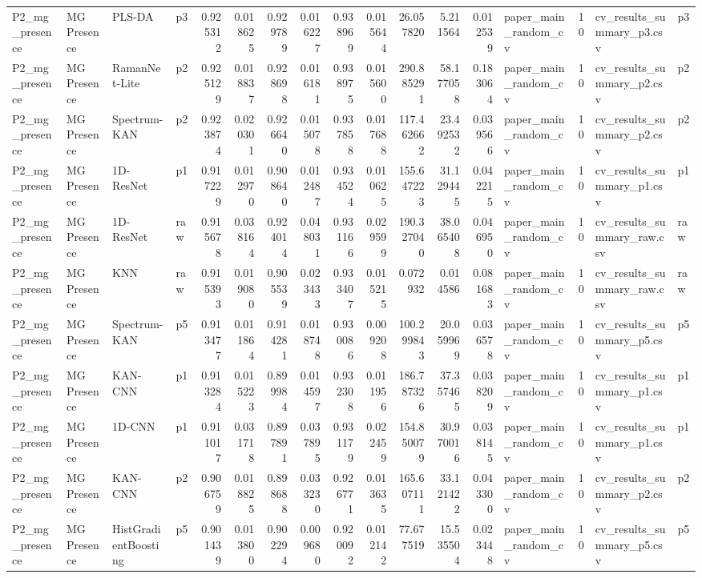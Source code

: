 \begin{tabular}{llllrrrrrrrrrlrll}
P2_mg_presence & MG Presence & PLS-DA & p3 & 0.925312 & 0.018625 & 0.929789 & 0.016227 & 0.938969 & 0.015644 & 26.057820 & 5.211564 & 0.012539 & paper_main_random_cv & 10 & cv_results_summary_p3.csv & p3 \\
P2_mg_presence & MG Presence & RamanNet-Lite & p2 & 0.925129 & 0.018837 & 0.928698 & 0.016181 & 0.938975 & 0.015600 & 290.885291 & 58.177058 & 0.183064 & paper_main_random_cv & 10 & cv_results_summary_p2.csv & p2 \\
P2_mg_presence & MG Presence & Spectrum-KAN & p2 & 0.923874 & 0.020301 & 0.926640 & 0.015078 & 0.937858 & 0.017688 & 117.462662 & 23.492532 & 0.039566 & paper_main_random_cv & 10 & cv_results_summary_p2.csv & p2 \\
P2_mg_presence & MG Presence & 1D-ResNet & p1 & 0.917229 & 0.012970 & 0.908640 & 0.012487 & 0.934524 & 0.010625 & 155.647223 & 31.129445 & 0.042215 & paper_main_random_cv & 10 & cv_results_summary_p1.csv & p1 \\
P2_mg_presence & MG Presence & 1D-ResNet & raw & 0.915678 & 0.038164 & 0.924014 & 0.048031 & 0.931166 & 0.029599 & 190.327040 & 38.065408 & 0.046950 & paper_main_random_cv & 10 & cv_results_summary_raw.csv & raw \\
P2_mg_presence & MG Presence & KNN & raw & 0.915393 & 0.019080 & 0.905539 & 0.023433 & 0.933407 & 0.015215 & 0.072932 & 0.014586 & 0.081683 & paper_main_random_cv & 10 & cv_results_summary_raw.csv & raw \\
P2_mg_presence & MG Presence & Spectrum-KAN & p5 & 0.913477 & 0.011864 & 0.914281 & 0.018748 & 0.930086 & 0.009208 & 100.299843 & 20.059969 & 0.036578 & paper_main_random_cv & 10 & cv_results_summary_p5.csv & p5 \\
P2_mg_presence & MG Presence & KAN-CNN & p1 & 0.913284 & 0.015223 & 0.899984 & 0.014597 & 0.932308 & 0.011956 & 186.787326 & 37.357465 & 0.038209 & paper_main_random_cv & 10 & cv_results_summary_p1.csv & p1 \\
P2_mg_presence & MG Presence & 1D-CNN & p1 & 0.911017 & 0.031718 & 0.897891 & 0.037895 & 0.931179 & 0.022459 & 154.850079 & 30.970016 & 0.038145 & paper_main_random_cv & 10 & cv_results_summary_p1.csv & p1 \\
P2_mg_presence & MG Presence & KAN-CNN & p2 & 0.906759 & 0.018825 & 0.898688 & 0.033230 & 0.926771 & 0.013635 & 165.607111 & 33.121422 & 0.043300 & paper_main_random_cv & 10 & cv_results_summary_p2.csv & p2 \\
P2_mg_presence & MG Presence & HistGradientBoosting & p5 & 0.901439 & 0.013800 & 0.902294 & 0.009680 & 0.920092 & 0.012142 & 77.677519 & 15.535504 & 0.023448 & paper_main_random_cv & 10 & cv_results_summary_p5.csv & p5 \\

\end{tabular}
